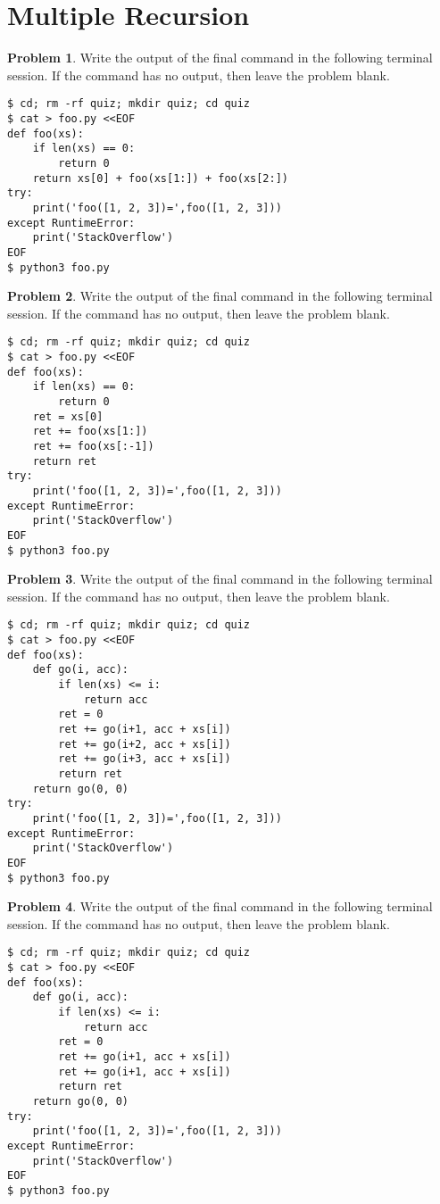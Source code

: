 \documentclass[10pt]{article}
\theoremstyle{definition}
\newtheorem{problem}{Problem}
\begin{document}
\section{Multiple Recursion}

\begin{problem}
    Write the output of the final command in the following terminal session.
    If the command has no output, then leave the problem blank.
\end{problem}
\begin{lstlisting}
$ cd; rm -rf quiz; mkdir quiz; cd quiz
$ cat > foo.py <<EOF
def foo(xs):
    if len(xs) == 0:
        return 0
    return xs[0] + foo(xs[1:]) + foo(xs[2:])
try:
    print('foo([1, 2, 3])=',foo([1, 2, 3]))
except RuntimeError:
    print('StackOverflow')
EOF
$ python3 foo.py
\end{lstlisting}


\begin{problem}
    Write the output of the final command in the following terminal session.
    If the command has no output, then leave the problem blank.
\end{problem}
\begin{lstlisting}
$ cd; rm -rf quiz; mkdir quiz; cd quiz
$ cat > foo.py <<EOF
def foo(xs):
    if len(xs) == 0:
        return 0
    ret = xs[0]
    ret += foo(xs[1:])
    ret += foo(xs[:-1])
    return ret
try:
    print('foo([1, 2, 3])=',foo([1, 2, 3]))
except RuntimeError:
    print('StackOverflow')
EOF
$ python3 foo.py
\end{lstlisting}

\filbreak
\begin{problem}
    Write the output of the final command in the following terminal session.
    If the command has no output, then leave the problem blank.
\end{problem}
\begin{lstlisting}
$ cd; rm -rf quiz; mkdir quiz; cd quiz
$ cat > foo.py <<EOF
def foo(xs):
    def go(i, acc):
        if len(xs) <= i:
            return acc
        ret = 0
        ret += go(i+1, acc + xs[i])
        ret += go(i+2, acc + xs[i])
        ret += go(i+3, acc + xs[i])
        return ret
    return go(0, 0)
try:
    print('foo([1, 2, 3])=',foo([1, 2, 3]))
except RuntimeError:
    print('StackOverflow')
EOF
$ python3 foo.py
\end{lstlisting}


\filbreak
\begin{problem}
    Write the output of the final command in the following terminal session.
    If the command has no output, then leave the problem blank.
\end{problem}
\begin{lstlisting}
$ cd; rm -rf quiz; mkdir quiz; cd quiz
$ cat > foo.py <<EOF
def foo(xs):
    def go(i, acc):
        if len(xs) <= i:
            return acc
        ret = 0
        ret += go(i+1, acc + xs[i])
        ret += go(i+1, acc + xs[i])
        return ret
    return go(0, 0)
try:
    print('foo([1, 2, 3])=',foo([1, 2, 3]))
except RuntimeError:
    print('StackOverflow')
EOF
$ python3 foo.py
\end{lstlisting}
\end{document}

